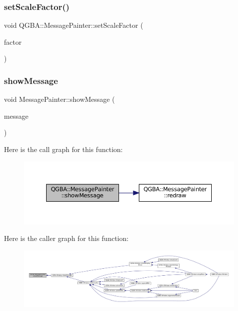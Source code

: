 \subsubsection{\texorpdfstring{set\+Scale\+Factor()}{setScaleFactor()}}
{\footnotesize\ttfamily void Q\+G\+B\+A\+::\+Message\+Painter\+::set\+Scale\+Factor (\begin{DoxyParamCaption}\item[{qreal}]{factor }\end{DoxyParamCaption})}

\mbox{\label{class_q_g_b_a_1_1_message_painter_acba4e5689aab5656c16fe87e04545558}} 
\subsubsection{\texorpdfstring{show\+Message}{showMessage}}
{\footnotesize\ttfamily void Message\+Painter\+::show\+Message (\begin{DoxyParamCaption}\item[{const Q\+String \&}]{message }\end{DoxyParamCaption})\hspace{0.3cm}{\ttfamily [slot]}}

Here is the call graph for this function\+:
\nopagebreak
\begin{figure}[H]
\begin{center}
\leavevmode
\includegraphics[width=350pt]{class_q_g_b_a_1_1_message_painter_acba4e5689aab5656c16fe87e04545558_cgraph}
\end{center}
\end{figure}
Here is the caller graph for this function\+:
\nopagebreak
\begin{figure}[H]
\begin{center}
\leavevmode
\includegraphics[width=350pt]{class_q_g_b_a_1_1_message_painter_acba4e5689aab5656c16fe87e04545558_icgraph}
\end{center}
\end{figure}


